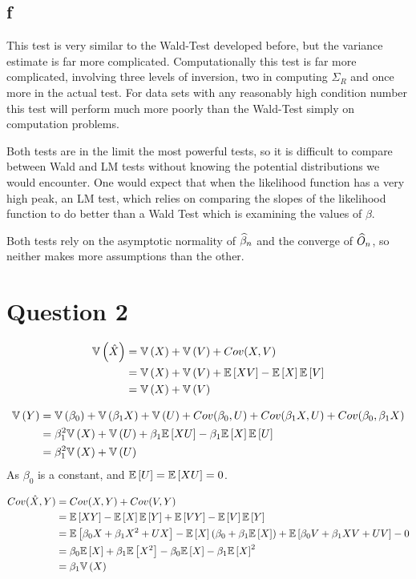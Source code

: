 \documentclass[12pt]{paper}
\begin{document}
\subsection*{f}
This test is very similar to the Wald-Test developed before, but the
variance estimate is far more complicated. Computationally this test
is far more complicated, involving three levels of inversion, two in
computing $\Sigma_R$ and once more in the actual test. For data sets with
any reasonably high condition number this test will perform much more
poorly than the Wald-Test simply on computation problems.

Both tests are in the limit the most powerful tests, so it is
difficult to compare between Wald and LM tests without knowing the
potential distributions we would encounter. One would expect that
when the likelihood function has a very high peak, an LM test, which
relies on comparing the slopes of the likelihood function to do better
than a Wald Test which is examining the values of $\beta$.

Both tests rely on the asymptotic normality of $\widehat{ \beta }_{n}$ and the
converge of $\widehat{ O }_{n}$, so neither makes more assumptions than the
other.

\section*{Question 2}

\begin{align*}
  \mathbb{V} \left ( \hat{X} \right ) &= \mathbb{V} \left ( X \right ) + \mathbb{V} \left ( V \right ) + Cov( X, V)\\
                 &= \mathbb{V} \left ( X \right ) + \mathbb{V} \left ( V \right ) + \mathbb{E} \left [ XV \right ] - \mathbb{E} \left [ X \right ]\mathbb{E} \left [ V \right ]\\
                 &= \mathbb{V} \left ( X \right ) + \mathbb{V} \left ( V \right )\\
\end{align*}

\begin{align*}
  \mathbb{V} \left ( Y \right ) &= \mathbb{V} \left ( \beta_0 \right ) + \mathbb{V} \left ( \beta_1 X \right ) + \mathbb{V} \left ( U \right ) + Cov( \beta_0, U) +
             Cov( \beta_1 X, U) + Cov( \beta_0, \beta_1 X)\\
           &= \beta_1^2 \mathbb{V} \left ( X \right ) + \mathbb{V} \left ( U \right ) + \beta_1 \mathbb{E} \left [ XU \right ] - \beta_1 \mathbb{E} \left [ X \right ] \mathbb{E} \left [ U \right ]\\
  &= \beta_1^2 \mathbb{V} \left ( X \right ) + \mathbb{V} \left ( U \right )\\
\end{align*}
As $\beta_0$ is a constant, and $\mathbb{E} \left [ U \right ] = \mathbb{E} \left [ XU \right ] = 0$.

\begin{align*}
  Cov( \hat{X}, Y) &= Cov( X, Y) + Cov( V, Y)\\
                   &= \mathbb{E} \left [ XY \right ] - \mathbb{E} \left [ X \right ]\mathbb{E} \left [ Y \right ] + \mathbb{E} \left [ VY \right ] - \mathbb{E} \left [ V \right ]\mathbb{E} \left [ Y \right ]\\
  &= \mathbb{E} \left [ \beta_0 X + \beta_1 X^2 + UX \right ] - \mathbb{E} \left [ X \right ](\beta_0 + \beta_1 \mathbb{E} \left [ X \right ]) + \mathbb{E} \left [ 
    \beta_0 V + \beta_1 XV + UV \right ] - 0\\
  &= \beta_0 \mathbb{E} \left [ X \right ] + \beta_1 \mathbb{E} \left [ X^2 \right ] - \beta_0 \mathbb{E} \left [ X \right ] - \beta_1 \mathbb{E} \left [ X \right ]^2\\
  &= \beta_1 \mathbb{V} \left ( X \right )
\end{align*}
\end{document}
